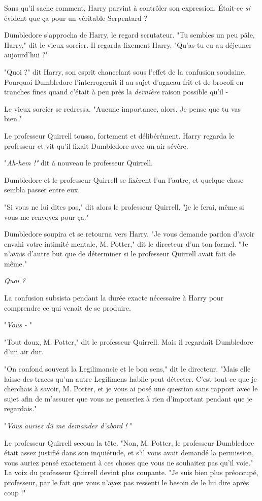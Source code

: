Sans qu'il sache comment, Harry parvint à contrôler son expression. Était-ce \emph{si}  évident que ça pour un véritable Serpentard ?

Dumbledore s'approcha de Harry, le regard scrutateur. "Tu sembles un peu pâle, Harry," dit le vieux sorcier. Il regarda fixement Harry. "Qu'as-tu eu au déjeuner aujourd'hui ?"

"Quoi ?" dit Harry, son esprit chancelant sous l'effet de la confusion soudaine. Pourquoi Dumbledore l'interrogerait-il au sujet d'agneau frit et de brocoli en tranches fines quand c'était à peu près la \emph{dernière}  raison possible qu'il -

Le vieux sorcier se redressa. "Aucune importance, alors. Je pense que tu vas bien."

Le professeur Quirrell toussa, fortement et délibérément. Harry regarda le professeur et vit qu'il fixait Dumbledore avec un air sévère.

"\emph{Ah-hem !"}  dit à nouveau le professeur Quirrell.

Dumbledore et le professeur Quirrell se fixèrent l'un l'autre, et quelque chose sembla passer entre eux.

"Si vous ne lui dites pas," dit alors le professeur Quirrell, "je le ferai, même si vous me renvoyez pour ça."

Dumbledore soupira et se retourna vers Harry. "Je vous demande pardon d'avoir envahi votre intimité mentale, M. Potter," dit le directeur d'un ton formel. "Je n'avais d'autre but que de déterminer si le professeur Quirrell avait fait de même."

\emph{Quoi ?} 

La confusion subsista pendant la durée exacte nécessaire à Harry pour comprendre ce qui venait de se produire.

"\emph{Vous -} "

"Tout doux, M. Potter," dit le professeur Quirrell. Mais il regardait Dumbledore d'un air dur.

"On confond souvent la Legilimancie et le bon sens," dit le directeur. "Mais elle laisse des traces qu'un autre Legilimens habile peut détecter. C'est tout ce que je cherchais à savoir, M. Potter, et je vous ai posé une question sans rapport avec le sujet afin de m'assurer que vous ne penseriez à rien d'important pendant que je regardais."

"\emph{Vous auriez dû me demander d'abord !} "

Le professeur Quirrell secoua la tête. "Non, M. Potter, le professeur Dumbledore était assez justifié dans son inquiétude, et s'il vous avait demandé la permission, vous auriez pensé exactement à ces choses que vous ne souhaitez pas qu'il voie." La voix du professeur Quirrell devint plus coupante. "Je suis bien plus préoccupé, professeur, par le fait que vous n'ayez pas ressenti le besoin de le lui dire après coup !"

